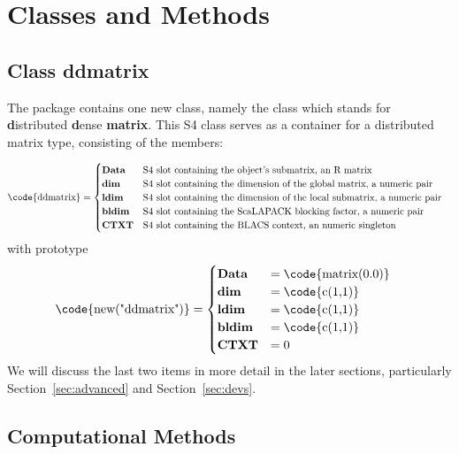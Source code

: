 \section[]{Classes and Methods}

\subsection[]{Class ddmatrix}

The package  contains one new class, namely the class  which stands for \textbf{d}istributed \textbf{d}ense \textbf{matrix}.  This S4 class serves as a container for a distributed matrix type, consisting of the members:

\begin{align*}
\text{\code{ddmatrix}}&=\begin{cases}
 $\textbf{Data}$ & $S4 slot containing the object's submatrix, an R matrix$\\
 $\textbf{dim}$ & $S4 slot containing the dimension of the global matrix, a numeric pair$\\
 $\textbf{ldim}$ & $S4 slot containing the dimension of the local submatrix, a numeric pair$\\
 $\textbf{bldim}$ & $S4 slot containing the ScaLAPACK blocking factor, a numeric pair$\\
 $\textbf{CTXT}$ & $S4 slot containing the BLACS context, an numeric singleton$
 \end{cases}
\end{align*}
with prototype
\begin{align*}
\text{\code{new("ddmatrix")}}&=\begin{cases}
 $\textbf{Data}$ & =\text{\code{matrix(0.0)}}\\
 $\textbf{dim}$ & =\text{\code{c(1,1)}}\\
 $\textbf{ldim}$ & =\text{\code{c(1,1)}}\\
 $\textbf{bldim}$ & =\text{\code{c(1,1)}}\\
 $\textbf{CTXT}$ & =0
 \end{cases}
\end{align*}
We will discuss the last two items in more detail in the later sections, particularly Section~\ref{sec:advanced} and Section~\ref{sec:devs}.




\subsection[]{Computational Methods}
\label{sec:methods}


